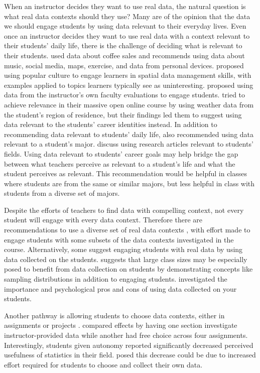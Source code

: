 \documentclass[
  12pt]{article}
\begin{document}
When an instructor decides they want to use real data, the natural
question is what real data contexts should they use? Many are of the
opinion that the data we should engage students by using data relevant
to their everyday lives. Even once an instructor decides they want to
use real data with a context relevant to their students' daily life,
there is the challenge of deciding what is relevant to their students.
\citet{sole2017} used data about coffee sales and \citet{gould2010}
recommends using data about music, social media, maps, exercise, and
data from personal devices. \citet{gunderman2020} proposed using popular
culture to engage learners in spatial data management skills, with
examples applied to topics learners typically see as uninteresting.
\citet{ludlow2002} proposed using data from the instructor's own faculty
evaluations to engage students. \citet{brooks2021} tried to achieve
relevance in their massive open online course by using weather data from
the student's region of residence, but their findings led them to
suggest using data relevant to the students' career identities instead.
In addition to recommending data relevant to students' daily life,
\citet{neumann2013} also recommended using data relevant to a student's
major. \citet{brearley2018} discuss using research articles relevant to
students' fields. Using data relevant to students' career goals may help
bridge the gap between what teachers perceive as relevant to a student's
life and what the student perceives as relevant. This recommendation
would be helpful in classes where students are from the same or similar
majors, but less helpful in class with students from a diverse set of
majors.

Despite the efforts of teachers to find data with compelling context,
not every student will engage with every data context. Therefore there
are recommendations to use a diverse set of real data contexts
\citep{gaise2016}, with effort made to engage students with some subsets
of the data contexts investigated in the course. Alternatively, some
suggest engaging students with real data by using data collected on the
students. \citet{schneiter2023} suggests that large class sizes may be
especially posed to benefit from data collection on students by
demonstrating concepts like sampling distributions in addition to
engaging students. \citet{hulsizer2009} investigated the importance and
psychological pros and cons of using data collected on your students.

Another pathway is allowing students to choose data contexts, either in
assignments \citep{boger2001} or projects \citep{cetinkaya-rundel2022}.
\citet{boger2001} compared effects by having one section investigate
instructor-provided data while another had free choice across four
assignments. Interestingly, students given autonomy reported
significantly decreased perceived usefulness of statistics in their
field. \citet{boger2001} posed this decrease could be due to increased
effort required for students to choose and collect their own data.
\end{document}
